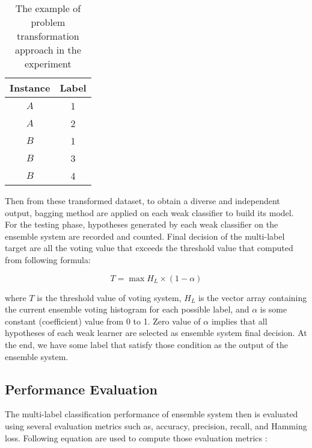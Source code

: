\documentclass{article}
\begin{document}
\begin{table}[t]
\caption{The example of problem transformation approach in the experiment}
\label{tab:transformation}
\vskip 0.15in
\begin{center}
\begin{small}
\begin{sc}
\begin{tabular}{cc}
\hline
\abovespace\belowspace
Instance & Label \\
\hline
\abovespace
$A$    	& 1  \\
$A$ 	& 2 \\
$B$ 	& 1 \\
$B$ 	& 3 \\
\belowspace
$B$ 	& 4 \\
\hline
\end{tabular}
\end{sc}
\end{small}
\end{center}
\vskip -0.1in
\end{table}

Then from these transformed dataset, to obtain a diverse and independent output, bagging method are applied on each weak classifier to build its model. For the testing phase, hypotheses generated by each weak classifier on the ensemble system are recorded and counted. Final decision of the multi-label target are all the voting value that exceeds the threshold value that computed from following formula:

\begin{equation}
T = \max{H_L} \times (1 - \alpha)
\end{equation}

\noindent where $T$ is the threshold value of voting system, $H_L$ is the vector array containing the current ensemble voting histogram for each possible label, and $\alpha$ is some constant (coefficient) value from 0 to 1. Zero value of $\alpha$ implies that all hypotheses of each weak learner are selected as ensemble system final decision. At the end, we have some label that satisfy those condition as the output of the ensemble system. 

\subsection{Performance Evaluation}
The multi-label classification performance of ensemble system then is evaluated using several evaluation metrics such as, accuracy, precision, recall, and Hamming loss. Following equation are used to compute those evaluation metrics \cite{Tsoumakas2007}:
\end{document}
